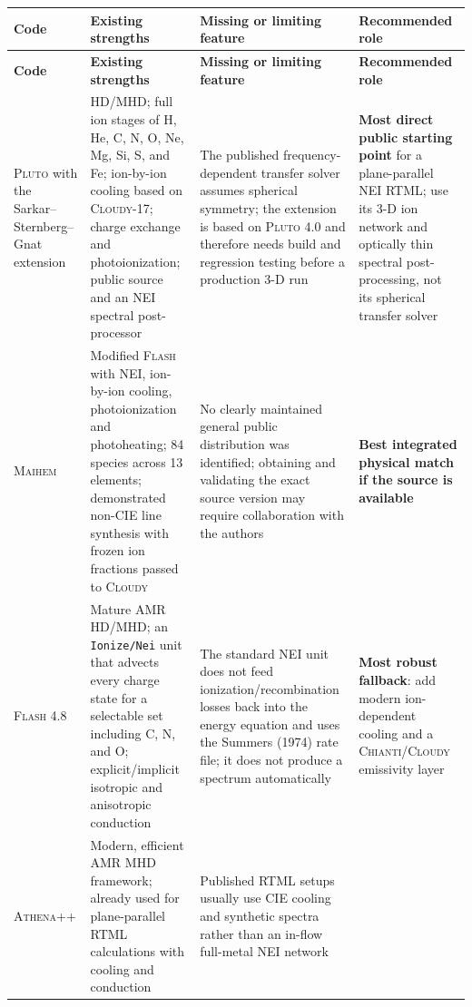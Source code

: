 \documentclass[english,a4paper]{my_memo2}
\begin{document}
\begin{longtable}{
 >{\raggedright\arraybackslash}p{2.4cm}
 >{\raggedright\arraybackslash}p{3.4cm}
 >{\raggedright\arraybackslash}p{4.5cm}
 >{\raggedright\arraybackslash}p{3.4cm}}
\toprule
\textbf{Code} & \textbf{Existing strengths} &
\textbf{Missing or limiting feature} & \textbf{Recommended role}\\
\midrule
\endfirsthead
\toprule
\textbf{Code} & \textbf{Existing strengths} &
\textbf{Missing or limiting feature} & \textbf{Recommended role}\\
\midrule
\endhead
\textsc{Pluto} with the Sarkar--Sternberg--Gnat extension &
HD/MHD; full ion stages of H, He, C, N, O, Ne, Mg, Si, S, and Fe;
ion-by-ion cooling based on \textsc{Cloudy}-17; charge exchange and
photoionization; public source and an NEI spectral post-processor &
The published frequency-dependent transfer solver assumes spherical
symmetry; the extension is based on \textsc{Pluto} 4.0 and therefore needs
build and regression testing before a production 3-D run &
\textbf{Most direct public starting point} for a plane-parallel NEI RTML;
use its 3-D ion network and optically thin spectral post-processing, not its
spherical transfer solver \cite{Sarkar2021}\\
\textsc{Maihem} &
Modified \textsc{Flash} with NEI, ion-by-ion cooling, photoionization and
photoheating; 84 species across 13 elements; demonstrated non-CIE line
synthesis with frozen ion fractions passed to \textsc{Cloudy} &
No clearly maintained general public distribution was identified; obtaining
and validating the exact source version may require collaboration with the
authors &
\textbf{Best integrated physical match if the source is available}
\cite{Gray2019}\\
\textsc{Flash} 4.8 &
Mature AMR HD/MHD; an \texttt{Ionize/Nei} unit that advects every charge
state for a selectable set including C, N, and O; explicit/implicit isotropic
and anisotropic conduction &
The standard NEI unit does not feed ionization/recombination losses back into
the energy equation and uses the Summers (1974) rate file; it does not
produce a spectrum automatically &
\textbf{Most robust fallback}: add modern ion-dependent cooling and a
\textsc{Chianti}/\textsc{Cloudy} emissivity layer
\cite{Fryxell2000,FLASHGuide}\\
\textsc{Athena++} &
Modern, efficient AMR MHD framework; already used for plane-parallel RTML
calculations with cooling and conduction &
Published RTML setups usually use CIE cooling and synthetic spectra rather
than an in-flow full-metal NEI network &

\end{longtable}
\end{document}

